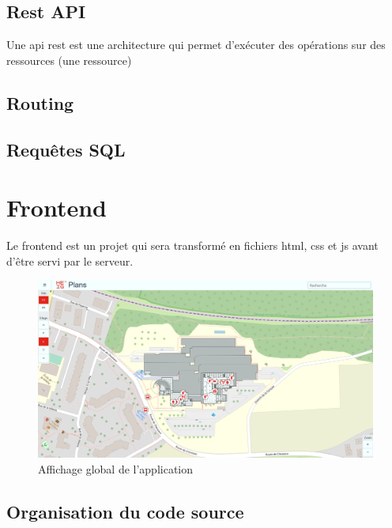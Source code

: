 \documentclass[
    iai, %
    il, %
]{heig-tb}
\begin{document}
\subsection{Rest API}
Une api rest est une architecture qui permet d'exécuter des opérations sur des ressources (une ressource)

\subsection{Routing}


\subsection{Requêtes SQL}


\section{Frontend}

Le frontend est un projet qui sera transformé en fichiers \gls{html}, \gls{css} et \gls{js} avant d'être servi par le serveur.

\begin{figure}[h]
    \centering
    \includegraphics[scale=0.3]{frontend-global.png}
    \caption{Affichage global de l'application}
\end{figure}

\subsection{Organisation du code source}
\end{document}
